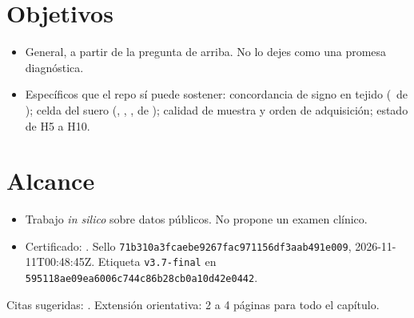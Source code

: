 \section{Objetivos}
\begin{itemize}
\item General, a partir de la pregunta de arriba. No lo dejes como una promesa diagnóstica.
\item Específicos que el repo sí puede sostener: concordancia de signo en tejido (\TejidoNum\ de \TejidoDen); celda del suero (\SueroDif, \SueroEq, \SueroInd, de \SueroN); calidad de muestra y orden de adquisición; estado de H5 a H10.
\end{itemize}

\section{Alcance}
\begin{itemize}
\item Trabajo \textit{in silico} sobre datos públicos. No propone un examen clínico. \cite{pepe2001}
\item Certificado: \CertificadoEstado. Sello \texttt{71b310a3fcaebe9267fac971156df3aab491e009}, 2026-11-11T00:48:45Z. Etiqueta \texttt{v3.7-final} en \texttt{595118ae09ea6006c744c86b28cb0a10d42e0442}.
\end{itemize}
Citas sugeridas: \cite{vasaikar2019,tanaka2024,rai2025,garciafoncillas2026,pepe2001}.
Extensión orientativa: 2 a 4 páginas para todo el capítulo.
